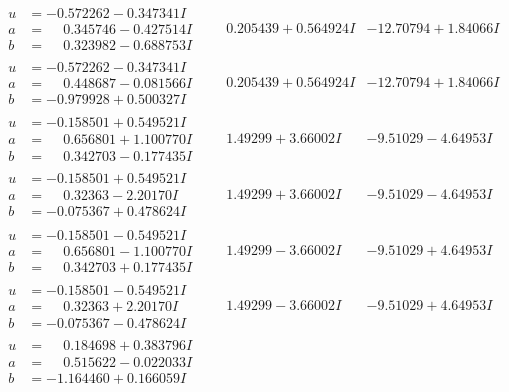 \documentclass[1p]{elsarticle_modified}
\theoremstyle{definition}
\begin{document}
$$\begin{array}{c|c|c}
\begin{aligned}
u &= -0.572262 - 0.347341 I \\
a &= \phantom{-}0.345746 - 0.427514 I \\
b &= \phantom{-}0.323982 - 0.688753 I\end{aligned}
 & \phantom{-}0.205439 + 0.564924 I & -12.70794 + 1.84066 I \\ \hline\begin{aligned}
u &= -0.572262 - 0.347341 I \\
a &= \phantom{-}0.448687 - 0.081566 I \\
b &= -0.979928 + 0.500327 I\end{aligned}
 & \phantom{-}0.205439 + 0.564924 I & -12.70794 + 1.84066 I \\ \hline\begin{aligned}
u &= -0.158501 + 0.549521 I \\
a &= \phantom{-}0.656801 + 1.100770 I \\
b &= \phantom{-}0.342703 - 0.177435 I\end{aligned}
 & \phantom{-}1.49299 + 3.66002 I & -9.51029 - 4.64953 I \\ \hline\begin{aligned}
u &= -0.158501 + 0.549521 I \\
a &= \phantom{-}0.32363 - 2.20170 I \\
b &= -0.075367 + 0.478624 I\end{aligned}
 & \phantom{-}1.49299 + 3.66002 I & -9.51029 - 4.64953 I \\ \hline\begin{aligned}
u &= -0.158501 - 0.549521 I \\
a &= \phantom{-}0.656801 - 1.100770 I \\
b &= \phantom{-}0.342703 + 0.177435 I\end{aligned}
 & \phantom{-}1.49299 - 3.66002 I & -9.51029 + 4.64953 I \\ \hline\begin{aligned}
u &= -0.158501 - 0.549521 I \\
a &= \phantom{-}0.32363 + 2.20170 I \\
b &= -0.075367 - 0.478624 I\end{aligned}
 & \phantom{-}1.49299 - 3.66002 I & -9.51029 + 4.64953 I \\ \hline\begin{aligned}
u &= \phantom{-}0.184698 + 0.383796 I \\
a &= \phantom{-}0.515622 - 0.022033 I \\
b &= -1.164460 + 0.166059 I\end{aligned}

\end{array}$$
\end{document}
